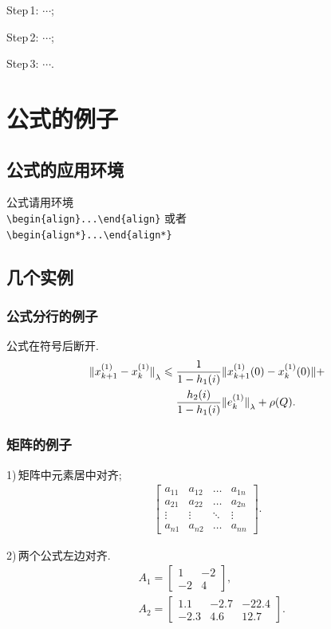\documentclass{ctacn}%
\begin{document}
\begin{multicols}{2}
Step\,1: $\cdots$;

Step\,2: $\cdots$;

Step\,3: $\cdots$.


\section{公式的例子}
\subsection{公式的应用环境}
公式请用环境\\
\verb|\begin{align}...\end{align}|
或者\\
\verb|\begin{align*}...\end{align*}|%
\subsection{几个实例}

\subsubsection{公式分行的例子}
公式在符号后断开.
\begin{align}
{\Arrowvert x^{(1)}_{k+1}-x^{(1)}_k\Arrowvert}_\lambda\leqslant \;&
\frac{1}{1-h_1(i)}\Arrowvert x^{(1)}_{k+1}(0)-x^{(1)}_k(0)\Arrowvert+\notag\\
&\frac{h_2(i)}{1-h_1(i)}{\Arrowvert
	e^{(1)}_k\Arrowvert}_\lambda+\rho(Q).
\end{align}


\subsubsection{矩阵的例子}
1)\,矩阵中元素居中对齐;
\begin{align}
\left[\begin{array}{cccc}
a_{11}& a_{12}&\dots &a_{1n}\\
a_{21}& a_{22}&\dots &a_{2n}\\
\vdots&\vdots& \ddots   &\vdots\\
a_{n1}& a_{n2}&\dots &a_{nn}
\end{array}\right].\end{align}

2)\,两个公式左边对齐.
\begin{align}
&A_1=\left[\begin{array}{cc} 1& -2\\-2 &4
\end{array}\right],\\
&A_2=\left[\begin{array}{ccc} 1.1 &-2.7&-22.4\\-2.3 &4.6 &12.7
\end{array}\right].
\end{align}



\end{multicols}
\end{document}
